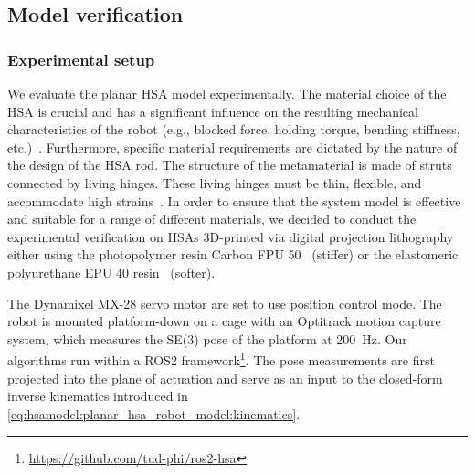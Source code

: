 \subsection{Model verification}\label{sub:hsamodel:planar_hsa_robot_model:model_verification}

\subsubsection{Experimental setup}\label{ssub:hsamodel:planar_hsa_robot_model:model_verification:experimental_setup}
We evaluate the planar \gls{HSA} model experimentally.
The material choice of the \gls{HSA} is crucial and has a significant influence on the resulting mechanical characteristics of the robot  (e.g., blocked force, holding torque, bending stiffness, etc.)~\cite{truby2021recipe}. Furthermore, specific material requirements are dictated by the nature of the design of the \gls{HSA} rod. The structure of the metamaterial is made of struts connected by living hinges. These living hinges must be thin, flexible, and accommodate high strains~\cite{truby2021recipe}.
In order to ensure that the system model is effective and suitable for a range of different materials, we decided to conduct the experimental verification on \glspl{HSA} 3D-printed via digital projection lithography either using the photopolymer resin Carbon FPU 50~\cite{carbon:fpu50} (stiffer) or the elastomeric polyurethane EPU 40 resin~\cite{carbon:epu40} (softer).

The Dynamixel MX-28 servo motor are set to use position control mode. %
The robot is mounted platform-down on a cage with an Optitrack motion capture system, which measures the SE(3) pose of the platform at \SI{200}{Hz}.
Our algorithms run within a ROS2 framework\footnote{\url{https://github.com/tud-phi/ros2-hsa}}. %
The pose measurements are first projected into the plane of actuation and serve as an input to the closed-form inverse kinematics introduced in \eqref{eq:hsamodel:planar_hsa_robot_model:kinematics}. 

